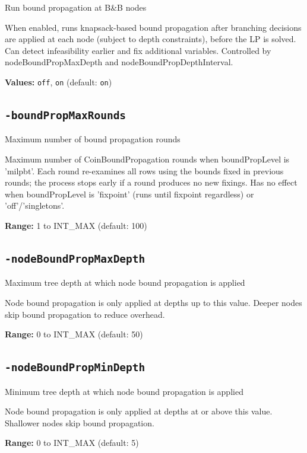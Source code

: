 \documentclass[11pt,a4paper]{article}
\begin{document}
Run bound propagation at B\&B nodes

When enabled, runs knapsack-based bound propagation after branching decisions are applied at each node (subject to depth constraints), before the LP is solved. Can detect infeasibility earlier and fix additional variables. Controlled by nodeBoundPropMaxDepth and nodeBoundPropDepthInterval.

\textbf{Values:} \texttt{off}, \texttt{on} (default: \texttt{on})

\subsection*{\texttt{-boundPropMaxRounds}}

Maximum number of bound propagation rounds

Maximum number of CoinBoundPropagation rounds when boundPropLevel is 'milpbt'. Each round re-examines all rows using the bounds fixed in previous rounds; the process stops early if a round produces no new fixings. Has no effect when boundPropLevel is 'fixpoint' (runs until fixpoint regardless) or 'off'/'singletons'.

\textbf{Range:} 1 to INT\_MAX (default: 100)

\subsection*{\texttt{-nodeBoundPropMaxDepth}}

Maximum tree depth at which node bound propagation is applied

Node bound propagation is only applied at depths up to this value. Deeper nodes skip bound propagation to reduce overhead.

\textbf{Range:} 0 to INT\_MAX (default: 50)

\subsection*{\texttt{-nodeBoundPropMinDepth}}

Minimum tree depth at which node bound propagation is applied

Node bound propagation is only applied at depths at or above this value. Shallower nodes skip bound propagation.

\textbf{Range:} 0 to INT\_MAX (default: 5)
\end{document}
